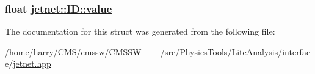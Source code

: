 \hypertarget{structjetnet_1_1ID_o2}{
\subsubsection[value]{\setlength{\rightskip}{0pt plus 5cm}float \hyperlink{structjetnet_1_1ID_o2}{jetnet::ID::value}}}
\label{structjetnet_1_1ID_o2}




The documentation for this struct was generated from the following file:\begin{CompactItemize}
\item 
/home/harry/CMS/cmssw/CMSSW\_\_\_/src/Physics\-Tools/Lite\-Analysis/interface/\hyperlink{jetnet_8hpp}{jetnet.hpp}\end{CompactItemize}
